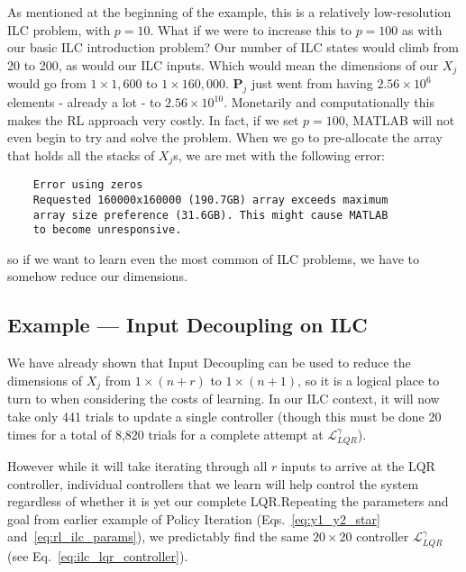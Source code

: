 As mentioned at the beginning of the example, this is a relatively low-resolution ILC problem, with $p=10$. What if we were to increase this to $p=100$ as with our basic ILC introduction problem?
Our number of ILC states would climb from 20 to 200, as would our ILC inputs. Which would mean the dimensions of our $X_j$ would go from $1\times1,600$ to $1\times160,000$. $\textbf{P}_j$ just went from having $2.56\times{10}^6$ elements - already a lot - to $2.56\times{10}^{10}$. Monetarily and computationally this makes the RL approach very costly. In fact, if we set $p=100$, MATLAB will not even begin to try and solve the problem. When we go to pre-allocate the array that holds all the stacks of $X_j$s, we are met with the following error:
\begin{center}
    \begin{verbatim}
    Error using zeros
    Requested 160000x160000 (190.7GB) array exceeds maximum 
    array size preference (31.6GB). This might cause MATLAB 
    to become unresponsive.
    \end{verbatim}
\end{center}
so if we want to learn even the most common of ILC problems, we have to somehow reduce our dimensions.

\FloatBarrier\subsection{Example --- Input Decoupling on ILC}
We have already shown that Input Decoupling can be used to reduce the dimensions of $X_j$ from $1\times\left(n+r\right)$ to $1\times\left(n+1\right)$, so it is a logical place to turn to when considering the costs of learning. In our ILC context, it will now take only 441 trials to update a single controller (though this must be done 20 times for a total of 8,820 trials for a complete attempt at $\mathcal{L}_{LQR}^\gamma$).

However while it will take iterating through all $r$ inputs to arrive at the LQR controller, individual controllers that we learn will help control the system regardless of whether it is yet our complete LQR.\@ Repeating the parameters and goal from earlier example of Policy Iteration (Eqs.~\ref{eq:y1_y2_star} and~\ref{eq:rl_ilc_params}), we predictably find the same $20 \times20$ controller $\mathcal{L}_{LQR}^\gamma$ (see Eq.~\ref{eq:ilc_lqr_controller}).

